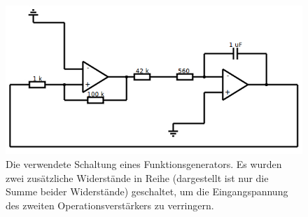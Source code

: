 \FloatBarrier
\begin{figure}[!h]
\centering
\includegraphics[scale=0.7]{../Grafiken/Funktionsgenerator_real.jpg}
\caption{Die verwendete Schaltung eines 
Funktionsgenerators. Es wurden zwei  zusätzliche Widerstände in Reihe 
(dargestellt ist nur die Summe beider Widerstände) geschaltet, um 
die Eingangspannung des zweiten Operationsverstärkers zu verringern.
\label{fig:funktionsgenerator_real}}
\end{figure}
\FloatBarrier